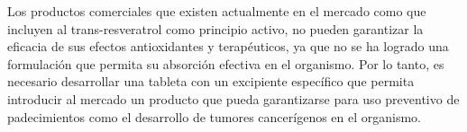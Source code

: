 Los productos comerciales que existen actualmente en el mercado
 como que incluyen al trans-resveratrol como principio activo, no pueden garantizar
 la eficacia de sus efectos antioxidantes y terapéuticos, ya que no se ha
 logrado una formulación que permita su absorción efectiva en el organismo.
Por lo tanto, es necesario desarrollar una tableta con un excipiente específico que permita introducir
al mercado un producto que pueda garantizarse para uso preventivo de padecimientos
como el desarrollo de tumores cancerígenos en el organismo.